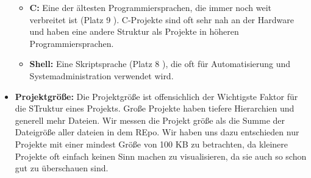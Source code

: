 \begin{itemize}
\begin{itemize}
        \item \textbf{C:} Eine der ältesten Programmiersprachen, die immer noch weit verbreitet ist (Platz 9 \cite{software_state_2022}). C-Projekte sind oft sehr nah an der Hardware und haben eine andere Struktur als Projekte in höheren Programmiersprachen.
        \item \textbf{Shell:} Eine Skriptsprache (Platz 8 \cite{software_state_2022}), die oft für Automatisierung und Systemadministration verwendet wird.
    \end{itemize}
    \item \textbf{Projektgröße:} Die Projektgröße ist offensichlich der Wichtigste Faktor für die STruktur eines Projekts. Große Projekte haben tiefere Hierarchien und generell mehr Dateien. Wir messen die Projekt größe als die Summe der Dateigröße aller dateien in dem REpo. Wir haben uns dazu entschieden nur Projekte mit einer mindest Größe von 100 KB zu betrachten, da kleinere Projekte oft einfach keinen Sinn machen zu visualisieren, da sie auch so schon gut zu überschauen sind.
\end{itemize}
    


